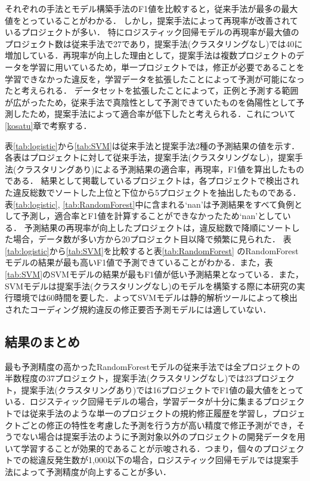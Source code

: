 \documentclass[11pt,dvipdfmx]{jreport}
\begin{document}
それぞれの手法とモデル構築手法のF1値を比較すると，従来手法が最多の最大値をとっていることがわかる．
しかし，提案手法によって再現率が改善されているプロジェクトが多い．
特にロジスティック回帰モデルの再現率が最大値のプロジェクト数は従来手法で27であり，提案手法(クラスタリングなし)では40に増加している．再現率が向上した理由として，提案手法は複数プロジェクトのデータを学習に用いているため，単一プロジェクトでは，修正が必要であることを学習できなかった違反を，学習データを拡張したことによって予測が可能になったと考えられる．
データセットを拡張したことによって，正例と予測する範囲が広がったため，従来手法で真陰性として予測できていたものを偽陽性として予測したため，提案手法によって適合率が低下したと考えられる．これについて\ref{kosatu}章で考察する．

表\ref{tab:logistic}から\ref{tab:SVM}は従来手法と提案手法2種の予測結果の値を示す．
各表はプロジェクトに対して従来手法，提案手法(クラスタリングなし)，提案手法(クラスタリングあり)による予測結果の適合率，再現率，F1値を算出したものである．
結果として掲載しているプロジェクトは，各プロジェクトで検出された違反総数でソートした上位と下位から5プロジェクトを抽出したものである．
表\ref{tab:logistic}, \ref{tab:RandomForest}中に含まれる`nan'は予測結果をすべて負例として予測し，適合率とF1値を計算することができなかったため`nan'としている．
予測結果の再現率が向上したプロジェクトは，違反総数で降順にソートした場合，データ数が多い方から20プロジェクト目以降で頻繁に見られた．
表\ref{tab:logistic}から\ref{tab:SVM}を比較すると表\ref{tab:RandomForest} のRandomForestモデルの結果が最も高いF1値で予測できていることがわかる．また，表\ref{tab:SVM}のSVMモデルの結果が最もF1値が低い予測結果となっている．また，SVMモデルは提案手法(クラスタリングなし)のモデルを構築する際に本研究の実行環境では60時間を要した．よってSVMモデルは静的解析ツールによって検出されたコーディング規約違反の修正要否予測モデルには適していない．

\subsection{結果のまとめ}

最も予測精度の高かったRandomForestモデルの従来手法では全プロジェクトの半数程度の37プロジェクト，提案手法(クラスタリングなし)では23プロジェクト，提案手法(クラスタリングあり)では16プロジェクトでF1値の最大値をとっている．ロジスティック回帰モデルの場合，学習データが十分に集まるプロジェクトでは従来手法のような単一のプロジェクトの規約修正履歴を学習し，プロジェクトごとの修正の特性を考慮した予測を行う方が高い精度で修正予測ができ，そうでない場合は提案手法のように予測対象以外のプロジェクトの開発データを用いて学習することが効果的であることが示唆される．つまり，個々のプロジェクトでの総違反発生数が1,000以下の場合，ロジスティック回帰モデルでは提案手法によって予測精度が向上することが多い．
\end{document}
